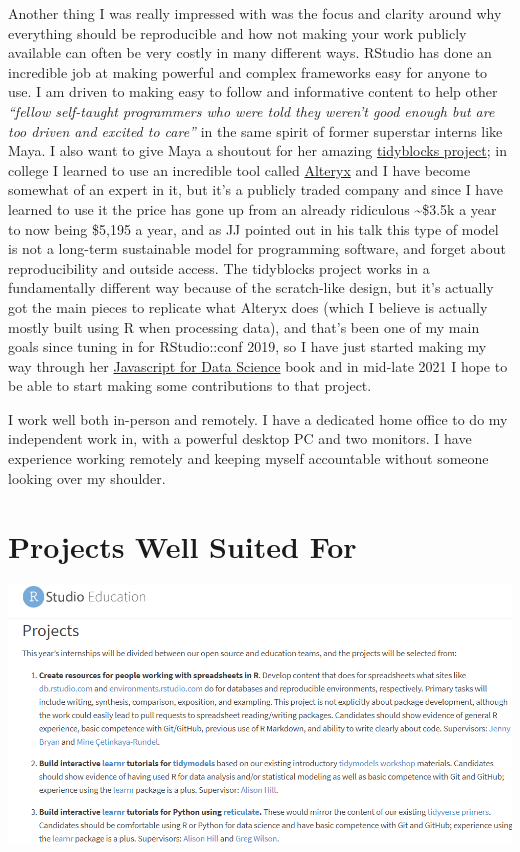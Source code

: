 \documentclass[
]{book}
\begin{document}
Another thing I was really impressed with was the focus and clarity around why everything should be reproducible and how not making your work publicly available can often be very costly in many different ways. RStudio has done an incredible job at making powerful and complex frameworks easy for anyone to use. I am driven to making easy to follow and informative content to help other \emph{``fellow self-taught programmers who were told they weren't good enough but are too driven and excited to care''} \citep{gans2020} in the same spirit of former superstar interns like Maya. I also want to give Maya a shoutout for her amazing \href{https://github.com/tidyblocks/tidyblocks}{tidyblocks project}; in college I learned to use an incredible tool called \href{https://www.alteryx.com/}{Alteryx} and I have become somewhat of an expert in it, but it's a publicly traded company and since I have learned to use it the price has gone up from an already ridiculous \textasciitilde\$3.5k a year to now being \$5,195 a year, and as JJ pointed out in his talk this type of model is not a long-term sustainable model for programming software, and forget about reproducibility and outside access. The tidyblocks project works in a fundamentally different way because of the scratch-like design, but it's actually got the main pieces to replicate what Alteryx does (which I believe is actually mostly built using R when processing data), and that's been one of my main goals since tuning in for RStudio::conf 2019, so I have just started making my way through her \href{http://js4ds.org/}{Javascript for Data Science} book and in mid-late 2021 I hope to be able to start making some contributions to that project.

I work well both in-person and remotely. I have a dedicated home office to do my independent work in, with a powerful desktop PC and two monitors. I have experience working remotely and keeping myself accountable without someone looking over my shoulder.

\hypertarget{ideal-projects}{%
\chapter{Projects Well Suited For}\label{ideal-projects}}

\includegraphics{images/projects_list.png}
\end{document}
